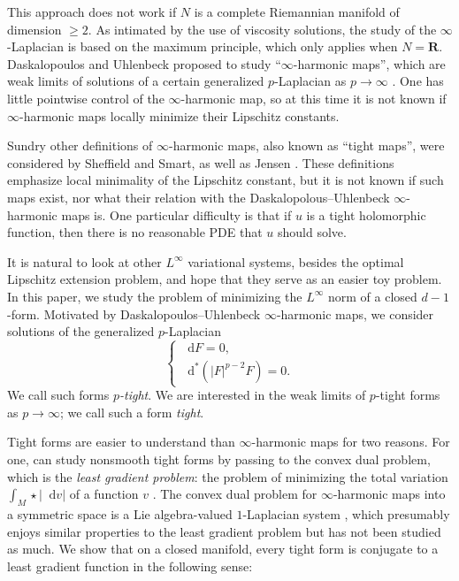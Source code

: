 \documentclass[reqno,11pt]{amsart}
\newcommand{\RR}{\mathbf{R}}
\newcommand*\dif{\mathop{}\!\mathrm{d}}
\newcommand{\dfn}[1]{\emph{#1}\index{#1}}
\theoremstyle{definition}
\numberwithin{equation}{section}
\begin{document}
This approach does not work if $N$ is a complete Riemannian manifold of dimension $\geq 2$.
As intimated by the use of viscosity solutions, the study of the $\infty$-Laplacian is based on the maximum principle, which only applies when $N = \RR$.
Daskalopoulos and Uhlenbeck proposed to study ``$\infty$-harmonic maps'', which are weak limits of solutions of a certain generalized $p$-Laplacian as $p \to \infty$ \cite{daskalopoulos2022}.
One has little pointwise control of the $\infty$-harmonic map, so at this time it is not known if $\infty$-harmonic maps locally minimize their Lipschitz constants.

Sundry other definitions of $\infty$-harmonic maps, also known as ``tight maps'', were considered by Sheffield and Smart, as well as Jensen \cite{Sheffield12}.
These definitions emphasize local minimality of the Lipschitz constant, but it is not known if such maps exist, nor what their relation with the Daskalopolous--Uhlenbeck $\infty$-harmonic maps is.
One particular difficulty is that if $u$ is a tight holomorphic function, then there is no reasonable PDE that $u$ should solve.

It is natural to look at other $L^\infty$ variational systems, besides the optimal Lipschitz extension problem, and hope that they serve as an easier toy problem.
In this paper, we study the problem of minimizing the $L^\infty$ norm of a closed $d - 1$-form.
Motivated by Daskalopoulos--Uhlenbeck $\infty$-harmonic maps, we consider solutions of the generalized $p$-Laplacian
\begin{equation}\label{p tight intro}
\begin{cases}
\dif F = 0, \\ 
\dif^*(|F|^{p - 2} F) = 0.
\end{cases}
\end{equation}
We call such forms \dfn{$p$-tight}.
We are interested in the weak limits of $p$-tight forms as $p \to \infty$; we call such a form \dfn{tight}.

Tight forms are easier to understand than $\infty$-harmonic maps for two reasons.
For one, can study nonsmooth tight forms by passing to the convex dual problem, which is the \dfn{least gradient problem}: the problem of minimizing the total variation $\int_M \star |\dif v|$ of a function $v$ \cite{gorny2024leastgradient}.
The convex dual problem for $\infty$-harmonic maps into a symmetric space is a Lie algebra-valued $1$-Laplacian system \cite{daskalopoulos2022}, which presumably enjoys similar properties to the least gradient problem but has not been studied as much.
We show that on a closed manifold, every tight form is conjugate to a least gradient function in the following sense:
\end{document}
